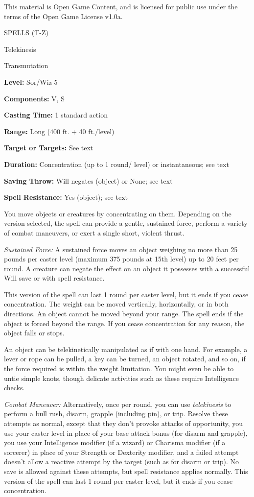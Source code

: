 \documentclass{article}
\begin{document}
This material is Open Game Content, and is licensed for public use under the terms 
of the Open Game License v1.0a.

{\LARGE{}SPELLS (T-Z)}

\vspace{12pt}
Telekinesis

Transmutation

\textbf{Level:} Sor/Wiz 5

\textbf{Components:} V, S

\textbf{Casting Time:} 1 standard action

\textbf{Range:} Long (400 ft. + 40 ft./level)

\textbf{Target or Targets:} See text

\textbf{Duration:} Concentration (up to 1 round/ level) or instantaneous; see text

\textbf{Saving Throw: }Will negates (object) or None; see text

\textbf{Spell Resistance:} Yes (object); see text

You move objects or creatures by concentrating on them. Depending on the version 
selected, the spell can provide a gentle, sustained force, perform a variety of 
combat maneuvers, or exert a single short, violent thrust.

\textit{Sustained Force: }A sustained force moves an object weighing no more than 
25 pounds per caster level (maximum 375 pounds at 15th level) up to 20 feet per 
round. A creature can negate the effect on an object it possesses with a successful 
Will save or with spell resistance.

This version of the spell can last 1 round per caster level, but it ends if you 
cease concentration. The weight can be moved vertically, horizontally, or in both 
directions. An object cannot be moved beyond your range. The spell ends if the 
object is forced beyond the range. If you cease concentration for any reason, the 
object falls or stops.

An object can be telekinetically manipulated as if with one hand. For example, 
a lever or rope can be pulled, a key can be turned, an object rotated, and so on, 
if the force required is within the weight limitation. You might even be able to 
untie simple knots, though delicate activities such as these require Intelligence 
checks.

\textit{Combat Maneuver: }Alternatively, once per round, you can use \textit{telekinesis 
}to perform a bull rush, disarm, grapple (including pin), or trip. Resolve these 
attempts as normal, except that they don't provoke attacks of opportunity, you 
use your caster level in place of your base attack bonus (for disarm and grapple), 
you use your Intelligence modifier (if a wizard) or Charisma modifier (if a sorcerer) 
in place of your Strength or Dexterity modifier, and a failed attempt doesn't allow 
a reactive attempt by the target (such as for disarm or trip). No save is allowed 
against these attempts, but spell resistance applies normally. This version of 
the spell can last 1 round per caster level, but it ends if you cease concentration.
\end{document}
